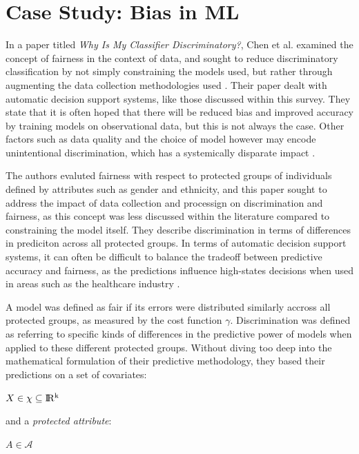\documentclass[a4paper]{article}
\begin{document}
\section{Case Study: Bias in ML}

In a paper titled \textit{Why Is My Classifier Discriminatory?}, Chen et al. examined the concept of fairness in the context of data, and sought to reduce discriminatory classification by not simply constraining the models used, but rather through augmenting the data collection methodologies used \cite{Chen_2018}. Their paper dealt with automatic decision support systems, like those discussed within this survey. They state that it is often hoped that there will be reduced bias and improved accuracy by training models on observational data, but this is not always the case. Other factors such as data quality and the choice of model however may encode unintentional discrimination, which has a systemically disparate impact \cite{Chen_2018}.

The authors evaluted fairness with respect to protected groups of individuals defined by attributes such as gender and ethnicity, and this paper sought to address the impact of data collection and processign on discrimination and fairness, as this concept was less discussed within the literature compared to constraining the model itself. They describe discrimination in terms of differences in prediciton across all protected groups. In terms of automatic decision support systems, it can often be difficult to balance the tradeoff between predictive accuracy and fairness, as the predictions influence high-states decisions when used in areas such as the healthcare industry \cite{Chen_2018}.

A model was defined as fair if its errors were distributed similarly accross all protected groups, as measured by the cost function $\gamma$. Discrimination was defined as referring to specific kinds of differences in the predictive power of models when applied to these different protected groups. Without diving too deep into the mathematical formulation of their predictive methodology, they based their predictions on a set of covariates:

\begin{center}
    $X \in \chi \subseteq \rm I\!R^k$
\end{center}

\noindent and a \textit{protected attribute}:

\begin{center}
    $A \in \mathcal{A}$
\end{center}
\end{document}
